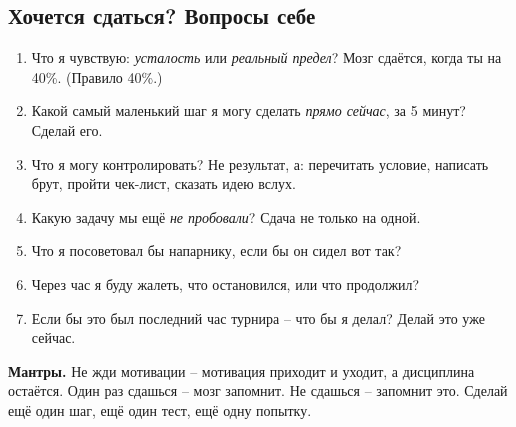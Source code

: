 \subsection{Хочется сдаться? Вопросы себе}
\par\begin{enumerate}
\item Что я чувствую: \emph{усталость} или \emph{реальный предел}? Мозг сдаётся, когда ты на 40\%. (Правило 40\%.)
\item Какой самый маленький шаг я могу сделать \emph{прямо сейчас}, за 5 минут? Сделай его.
\item Что я могу контролировать? Не результат, а: перечитать условие, написать брут, пройти чек-лист, сказать идею вслух.
\item Какую задачу мы ещё \emph{не пробовали}? Сдача не только на одной.
\item Что я посоветовал бы напарнику, если бы он сидел вот так?
\item Через час я буду жалеть, что остановился, или что продолжил?
\item Если бы это был последний час турнира -- что бы я делал? Делай это уже сейчас.
\end{enumerate}
\par \textbf{Мантры.} Не жди мотивации -- мотивация приходит и уходит, а дисциплина остаётся. Один раз сдашься -- мозг запомнит. Не сдашься -- запомнит это. Сделай ещё один шаг, ещё один тест, ещё одну попытку.
